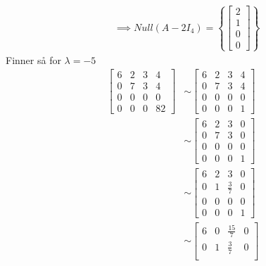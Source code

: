 \documentclass[11pt, a4paper, norsk]{NTNUoving}
\begin{document}
\begin{oppgave}
\begin{punkt}
\begin{align*}
                &\implies Null(A - 2I_4) = \left\{\begin{bmatrix}
                    2 \\
                    1 \\
                    0 \\
                    0
                \end{bmatrix}\right\}
            \end{align*}
            Finner så for $\lambda = -5$
            \begin{align*}
                \begin{bmatrix}
                    6 & 2 & 3 & 4 \\
                    0 & 7 & 3 & 4 \\
                    0 & 0 & 0 & 0 \\
                    0 & 0 & 0 & 82
                \end{bmatrix} &\sim \begin{bmatrix}
                6 & 2 & 3 & 4 \\
                0 & 7 & 3 & 4 \\
                0 & 0 & 0 & 0 \\
                0 & 0 & 0 & 1
                \end{bmatrix}
                \\
                &\sim \begin{bmatrix}
                    6 & 2 & 3 & 0 \\
                    0 & 7 & 3 & 0 \\
                    0 & 0 & 0 & 0 \\
                    0 & 0 & 0 & 1
                \end{bmatrix}
                \\
                &\sim \begin{bmatrix}
                    6 & 2 & 3 & 0 \\
                    0 & 1 & \frac{3}{7} & 0 \\
                    0 & 0 & 0 & 0 \\
                    0 & 0 & 0 & 1
                \end{bmatrix}
                \\
                &\sim \begin{bmatrix}
                    6 & 0 & \frac{15}{7} & 0 \\
                    0 & 1 & \frac{3}{7} & 0 \\

\end{bmatrix}
\end{align*}
\end{punkt}
\end{oppgave}
\end{document}
